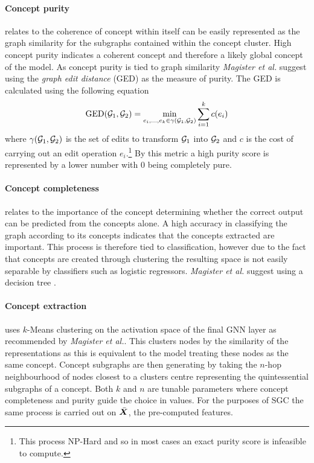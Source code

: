 \paragraph{Concept purity}
relates to the coherence of concept within itself can be easily represented as the graph similarity for the subgraphs contained within the concept cluster.
High concept purity indicates a coherent concept and therefore a likely global concept of the model.
As concept purity is tied to graph similarity \textit{Magister et al.}\cite{magister2021gcexplainer} suggest using the \emph{graph edit distance} (GED) as the measure of purity.
The GED is calculated using the following equation
\begin{equation}
    \label{eq:GED}
    \operatorname{GED}({\mathcal{G}}_1, {\mathcal{G}}_2) = \underset{e_i,...,e_k \in \gamma({\mathcal{G}}_1, {\mathcal{G}}_2)}{\operatorname{min}} \sum_{i=1}^{k}c(e_i)
\end{equation}
where $\gamma({\mathcal{G}}_1, {\mathcal{G}}_2)$ is the set of edits to transform ${\mathcal{G}}_1$ into ${\mathcal{G}}_2$ and $c$ is the cost of carrying out an edit operation $e_i$.\footnote{This process NP-Hard and so in most cases an exact purity score is infeasible to compute.}
By this metric a high purity score is represented by a lower number with 0 being completely pure.

\paragraph{Concept completeness}
relates to the importance of the concept determining whether the correct output can be predicted from the concepts alone.
A high accuracy in classifying the graph according to its concepts indicates that the concepts extracted are important.
This process is therefore tied to classification, however due to the fact that concepts are created through clustering the resulting space is not easily separable by classifiers such as logistic regressors.
\textit{Magister et al.}\cite{magister2021gcexplainer} suggest using a decision tree .



\paragraph{Concept extraction}
uses $k$-Means clustering on the activation space of the final GNN layer as recommended by \textit{Magister et al.}\cite{magister2021gcexplainer}.
This clusters nodes by the similarity of the representations as this is equivalent to the model treating these nodes as the same concept.
Concept subgraphs are then generating by taking the $n$-hop neighbourhood of nodes closest to a clusters centre representing the quintessential subgraphs of a concept.
Both $k$ and $n$ are tunable parameters where concept completeness and purity guide the choice in values.
For the purposes of SGC the same process is carried out on $\bar{{\bm{X}}}$, the pre-computed features.

